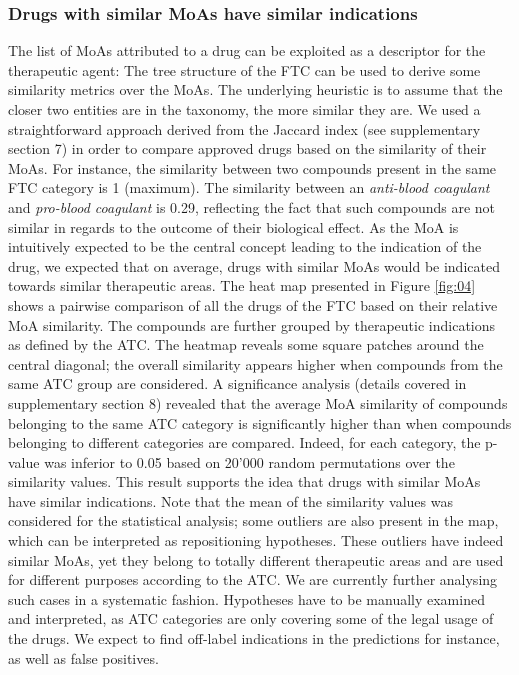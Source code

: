 \documentclass{bioinfo}
\begin{document}
\subsubsection{Drugs with similar MoAs have similar indications}
The list of MoAs attributed to a drug can be exploited as a descriptor for the therapeutic agent:
The tree structure of the FTC can be used to derive some similarity metrics over the MoAs. The underlying 
heuristic is to assume that the closer two entities are in the taxonomy, the more similar they are. 
We used a straightforward approach derived from the Jaccard index (see supplementary section 7) in order to compare 
approved drugs based on the similarity of their MoAs. For instance, the similarity between two compounds present in 
the same FTC category is 1 (maximum). The similarity between an \emph{anti-blood coagulant} and \emph{pro-blood coagulant} is 0.29, 
reflecting the fact that such compounds are not similar in regards to the outcome of their biological effect. As the MoA is 
intuitively expected to be the central concept leading to the indication of the drug, we expected that on average, drugs with 
similar MoAs would be indicated towards similar therapeutic areas. The heat map presented in Figure \ref{fig:04} shows a pairwise 
comparison of all the drugs of the FTC based on their relative MoA similarity. The compounds are further grouped by 
therapeutic indications as defined by the ATC.
The heatmap reveals some square patches around the central diagonal;
the overall similarity appears higher when compounds from the same ATC group are considered. 
A significance analysis (details covered in supplementary section 8)
revealed that the average MoA similarity of compounds belonging to the same ATC category is 
significantly higher than when compounds belonging to different categories are compared. Indeed, for 
each category, the p-value was inferior to 0.05 based on 20'000 random permutations over the similarity values. 
This result supports the idea that drugs with similar MoAs have similar indications. Note that the mean of the 
similarity values was considered for the statistical analysis; some outliers are also present in the map, which 
can be interpreted as repositioning hypotheses. These outliers have indeed similar MoAs, yet they belong to totally 
different therapeutic areas and are used for different purposes according to the ATC. We are currently further analysing 
such cases in a systematic fashion. Hypotheses have to be manually examined and interpreted, as ATC categories are
only covering some of the legal usage of the drugs. We expect to find off-label indications in 
the predictions for instance, as well as false positives.
\end{document}
